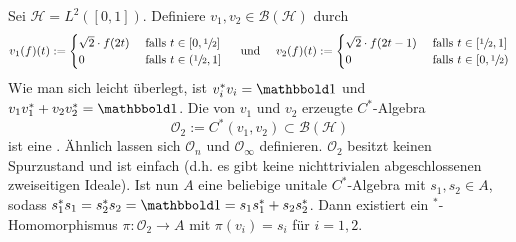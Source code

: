 \begin{beispiel}[{name=[Cuntz-Algebren]}]
	Sei $\mathcal{H}= L^2([0,1])$.
	Definiere $v_1,v_2 \in \mathcal{B}(\mathcal{H})$ durch
	\[
		v_1(f)(t) := \begin{cases}
			\sqrt{2} \cdot f(2t) &\text{ falls }t \in [0,\sfrac{1}{2}]\\
			0 &\text{ falls } t \in (\sfrac{1}{2},1]
		\end{cases}
		\quad \text{ und } \quad 
		v_2(f)(t) := \begin{cases}
			\sqrt{2} \cdot f(2t-1) &\text{ falls }t \in [\sfrac{1}{2},1]\\
			0 &\text{ falls } t \in [0,\sfrac{1}{2})
		\end{cases} 
	\]
	Wie man sich leicht überlegt, ist $v_i^* v_i=\ind$ und $v_1v_1^* + v_2v_2^*=\ind$. 
	Die von $v_1$ und $v_2$ erzeugte $C^*$-Algebra  
	\[
		\mathcal{O}_2 := C^*(v_1,v_2) \subset \mathcal{B}(\mathcal{H}) 
	\]
	ist eine \href{https://de.wikipedia.org/wiki/Cuntz-Algebra}{}. Ähnlich lassen sich $\mathcal{O}_n$ und $\mathcal{O}_\infty$ definieren.
	$\mathcal{O}_2$ besitzt keinen Spurzustand und ist einfach (d.h. es gibt keine nichttrivialen abgeschlossenen zweiseitigen Ideale).
	Ist nun $A$ eine beliebige unitale $C^*$-Algebra mit $s_1,s_2 \in A$, sodass $s_1^*s_1 = s_2^*s_2=\ind = s_1s_1^* + s_2s_2^*$.
	Dann existiert ein $^*$-Homomorphismus $\pi \colon \mathcal{O}_2 \to A$ mit $\pi(v_i)=s_i$ für $i=1,2$.
	\begin{figure}[bht]
	\end{figure}
\end{beispiel}
\newpage

